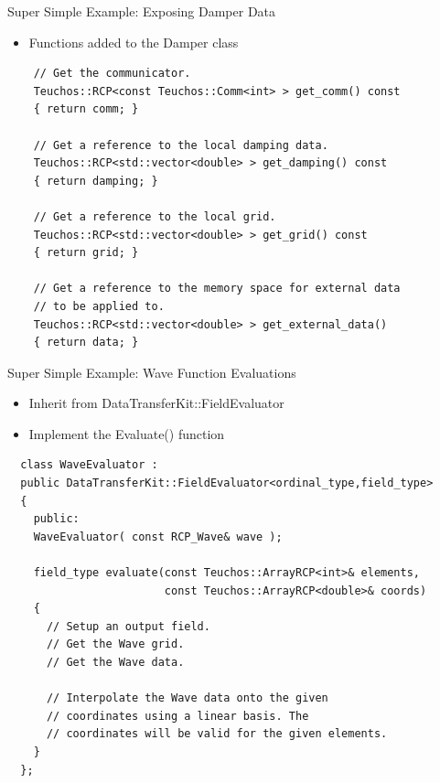 \documentclass{beamer}
\begin{document}
\begin{frame}[fragile]{Super Simple Example: Exposing Damper Data}

  \begin{itemize}
  \item Functions added to the Damper class
  \end{itemize}

  \begin{lstlisting}
    // Get the communicator.
    Teuchos::RCP<const Teuchos::Comm<int> > get_comm() const
    { return comm; }

    // Get a reference to the local damping data.
    Teuchos::RCP<std::vector<double> > get_damping() const
    { return damping; }

    // Get a reference to the local grid.
    Teuchos::RCP<std::vector<double> > get_grid() const
    { return grid; }

    // Get a reference to the memory space for external data 
    // to be applied to.
    Teuchos::RCP<std::vector<double> > get_external_data()
    { return data; }
  \end{lstlisting}

\end{frame}

\begin{frame}[fragile]{Super Simple Example: Wave Function Evaluations}

  \begin{itemize}
  \item Inherit from DataTransferKit::FieldEvaluator
  \item Implement the Evaluate() function
  \end{itemize}
 
  \begin{lstlisting}
  class WaveEvaluator : 
  public DataTransferKit::FieldEvaluator<ordinal_type,field_type>
  {
    public:
    WaveEvaluator( const RCP_Wave& wave );

    field_type evaluate(const Teuchos::ArrayRCP<int>& elements,
                        const Teuchos::ArrayRCP<double>& coords)
    {
      // Setup an output field.
      // Get the Wave grid.
      // Get the Wave data.

      // Interpolate the Wave data onto the given 
      // coordinates using a linear basis. The 
      // coordinates will be valid for the given elements.
    }
  };
  \end{lstlisting}

\end{frame}
\end{document}
